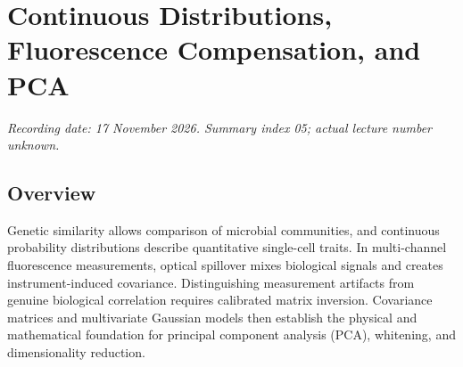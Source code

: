 
\chapter{Continuous Distributions, Fluorescence Compensation, and PCA}
\label{ch:l05-continuous}
\noindent\textit{Recording date: 17 November 2026. Summary index 05; actual lecture number unknown.}

\section*{Overview}
Genetic similarity allows comparison of microbial communities, and continuous probability distributions describe quantitative single-cell traits. In multi-channel fluorescence measurements, optical spillover mixes biological signals and creates instrument-induced covariance. Distinguishing measurement artifacts from genuine biological correlation requires calibrated matrix inversion. Covariance matrices and multivariate Gaussian models then establish the physical and mathematical foundation for principal component analysis (PCA), whitening, and dimensionality reduction.

